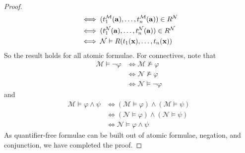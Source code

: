\begin{proof}
\begin{align*}
        &\iff (t_1^{\mathcal M}(\vb a), \dots, t_n^{\mathcal M}(\vb a)) \in R^{\mathcal N} \\
        &\iff (t_1^{\mathcal N}(\vb a), \dots, t_n^{\mathcal N}(\vb a)) \in R^{\mathcal N} \\
        &\iff \mathcal N \vDash R(t_1(\vb x), \dots, t_n(\vb x))
    \end{align*}
    So the result holds for all atomic formulae.
    For connectives, note that
    \begin{align*}
        \mathcal M \vDash \neg \varphi &\iff \mathcal M \nvDash \varphi \\
        &\iff \mathcal N \nvDash \varphi \\
        &\iff \mathcal N \vDash \neg \varphi
    \end{align*}
    and
    \begin{align*}
        \mathcal M \vDash \varphi \wedge \psi &\iff (\mathcal M \vDash \varphi) \wedge (\mathcal M \vDash \psi) \\
        &\iff (\mathcal N \vDash \varphi) \wedge (\mathcal N \vDash \psi) \\
        &\iff \mathcal N \vDash \varphi \wedge \psi
    \end{align*}
    As quantifier-free formulae can be built out of atomic formulae, negation, and conjunction, we have completed the proof.
\end{proof}

